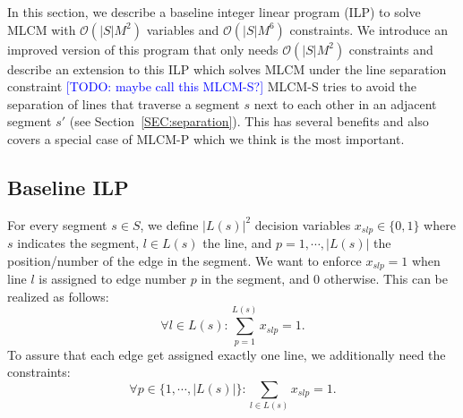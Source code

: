 \documentclass{llncs}
\newcommand\todo[1]{\textcolor{blue}{[TODO: #1]}}
\begin{document}
In this section, we describe a baseline integer linear program (ILP) to solve MLCM with $\mathcal{O}(|S|M^{2})$ variables and $\mathcal{O}(|S|M^{6})$ constraints.
We introduce an improved version of this program that only needs $\mathcal{O}(|S|M^2)$ constraints and describe an extension to this ILP which solves MLCM under the line separation constraint \todo{maybe call this MLCM-S?}
MLCM-S tries to avoid the separation of lines that traverse a segment $s$ next to each other in an adjacent segment $s'$ (see Section~\ref{SEC:separation}).
This has several benefits and also covers a special case of MLCM-P which we think is the most important.

%
\subsection{Baseline ILP}\label{SEC:baseline}
%
For every segment $s \in S$, we define $|L(s)|^{2}$ decision variables $x_{slp} \in \{0,1\}$ where $s$ indicates the segment, $l \in L(s)$ the line, and $p=1, \cdots, |L(s)|$ the position/number of the edge in the segment. We want to enforce $x_{slp}=1$ when line $l$ is assigned to edge number $p$ in the segment, and $0$ otherwise. This can be realized as follows:
\begin{equation*}
\forall l \in L(s): \sum_{p=1}^{L(s)} x_{slp}=1.
\end{equation*}
To assure that each edge get assigned exactly one line, we additionally need the constraints:
\begin{equation*}
	\forall p \in  \{1,\cdots,|L(s)|\} : \sum_{l \in L(s)} x_{slp} = 1.
\end{equation*}
\end{document}
